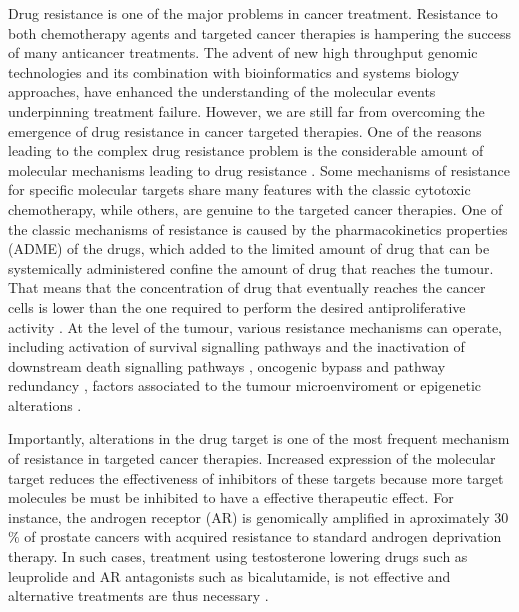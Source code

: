 \documentclass[11pt, b5paper,twoside]{tesi_upf}
\begin{document}
\par Drug resistance is one of the major problems in cancer treatment. Resistance to both chemotherapy agents and targeted cancer therapies is hampering the success of many anticancer treatments. The advent of new high throughput genomic technologies and its combination with bioinformatics and systems biology approaches, have enhanced the understanding of the molecular events underpinning treatment failure. However, we are still far from overcoming the emergence of drug resistance in cancer targeted therapies. One of the reasons leading to the complex drug resistance problem is the considerable amount of molecular mechanisms leading to drug resistance \cite{Holohan2013}. Some mechanisms of resistance for specific molecular targets share many features with the classic cytotoxic chemotherapy, while others, are genuine to the targeted cancer therapies. One of the classic mechanisms of resistance is caused by the pharmacokinetics properties (ADME) of the drugs, which added to the limited amount of drug that can be systemically administered confine the amount of drug that reaches the tumour. That means that the concentration of drug that eventually reaches the cancer cells is lower than the one required to perform the desired antiproliferative activity \cite{Gottesman2002}. At the level of the tumour, various resistance mechanisms can operate, including activation of survival signalling pathways and the inactivation of downstream death signalling pathways \cite{Lowe2004}, oncogenic bypass and pathway redundancy \cite{Logue2012}, factors associated to the tumour microenviroment \cite{McMillin2013} or epigenetic alterations \cite{Maier2005}.
\par Importantly, alterations in the drug target is one of the most frequent mechanism of resistance in targeted cancer therapies. Increased expression of the molecular target reduces the effectiveness of inhibitors of these targets because more target molecules be must be inhibited to have a effective therapeutic effect. For instance, the androgen receptor (AR) is genomically amplified in aproximately 30$\%$ of prostate cancers with acquired resistance to standard androgen deprivation therapy. In such cases, treatment using testosterone lowering drugs such as leuprolide and AR antagonists such as bicalutamide, is not effective and alternative treatments are thus necessary \cite{Koivisto1997}. 
\end{document}
